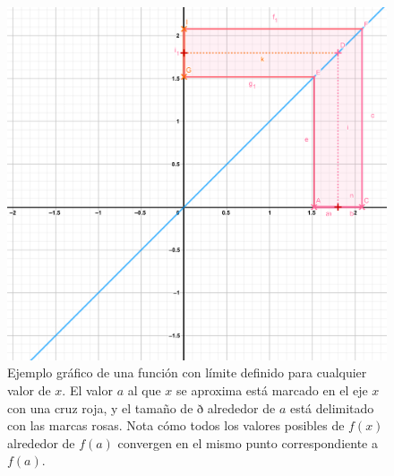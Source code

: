 \documentclass[
]{book}
\begin{document}
\begin{figure}

{\centering \includegraphics[width=21.38in]{Unidad-III/Limite-x} 

}

\caption{Ejemplo gráfico de una función con límite definido para cualquier valor de $x$. El valor $a$ al que $x$ se aproxima está marcado en el eje $x$ con una cruz roja, y el tamaño de ð alrededor de $a$ está delimitado con las marcas rosas. Nota cómo todos los valores posibles de $f(x)$ alrededor de $f(a)$ convergen en el mismo punto correspondiente a $f(a)$.}\label{fig:limite-def}
\end{figure}
\end{document}
